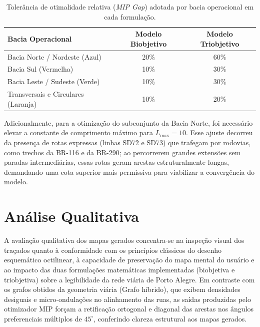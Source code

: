 \documentclass[cic,tc]{infufrgs}
\begin{document}
\begin{table}[H]
    \centering
    \caption{Tolerância de otimalidade relativa (\textit{MIP Gap}) adotada por bacia operacional em cada formulação.}
    \label{tab:mipgap_bacias}
    \begin{tabular}{lcc}
        \toprule
        \textbf{Bacia Operacional} & \textbf{Modelo Biobjetivo} & \textbf{Modelo Triobjetivo} \\
        \midrule
        Bacia Norte / Nordeste (Azul)          & 20\% & 60\% \\
        Bacia Sul (Vermelha)                   & 10\% & 30\% \\
        Bacia Leste / Sudeste (Verde)          & 10\% & 30\% \\
        Transversais e Circulares (Laranja)    & 10\% & 20\% \\
        \bottomrule
    \end{tabular}
\end{table}

Adicionalmente, para a otimização do subconjunto da Bacia Norte, foi necessário elevar a constante de comprimento máximo para $L_{\max} = 10$. Esse ajuste decorreu da presença de rotas expressas (linhas SD72 e SD73) que trafegam por rodovias, como trechos da BR-116 e da BR-290; ao percorrerem grandes extensões sem paradas intermediárias, essas rotas geram arestas estruturalmente longas, demandando uma cota superior mais permissiva para viabilizar a convergência do modelo.

\section{Análise Qualitativa}
\label{sec:analise_qualitativa}
A avaliação qualitativa dos mapas gerados concentra-se na inspeção visual dos traçados quanto à conformidade com os princípios clássicos do desenho esquemático octilinear, à capacidade de preservação do mapa mental do usuário e ao impacto das duas formulações matemáticas implementadas (biobjetiva e triobjetiva) sobre a legibilidade da rede viária de Porto Alegre. Em contraste com os grafos obtidos da geometria viária (Grafo híbrido), que exibem densidades desiguais e micro-ondulações no alinhamento das ruas, as saídas produzidas pelo otimizador MIP forçam a retificação ortogonal e diagonal das arestas nos ângulos preferenciais múltiplos de $45^\circ$, conferindo clareza estrutural aos mapas gerados.
\end{document}
